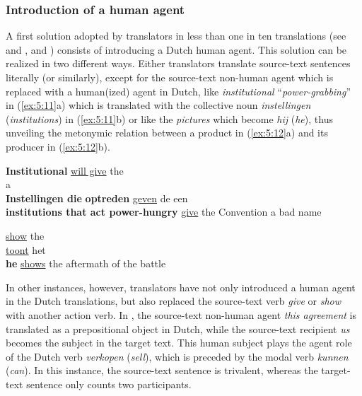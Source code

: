 \documentclass[output=paper]{LSP/langsci}
\begin{document}
\subsubsection{Introduction of a human agent} \label{sec:5:6:2:1}

A first solution adopted by translators in less than one in ten translations (see  and ,  and ) consists of introducing a Dutch human agent. This solution can be realized in two different ways. Either translators translate source-text sentences literally (or similarly), except for the source-text non-human agent which is replaced with a human(ized) agent in Dutch, like \textit{institutional} “\textit{power-grabbing}” in (\ref{ex:5:11}a) which is translated with the collective noun \textit{instellingen} (\textit{institutions}) in (\ref{ex:5:11}b) or like the \textit{pictures} which become \textit{hij} (\textit{he}), thus unveiling the metonymic relation between a product in (\ref{ex:5:12}a) and its producer in (\ref{ex:5:12}b).  

\ea \label{ex:5:11}
\ea \textbf{Institutional}  \ul{will give} the \\ a \\[1em]
\ex \textbf{Instellingen die}  \textbf{optreden} \ul{geven} de  een \\
\textbf{institutions that act power-hungry} \ul{give} the Convention a bad name
\z
\z


\ea \label{ex:5:12}
\ea
{} \ul{show} the \\[1em]
\ex {} \ul{toont} het \\
\textbf{he} \ul{shows} the aftermath of the battle
\z
\z
{}


In other instances, however, translators have not only introduced a human agent in the Dutch translations, but also replaced the source-text verb \textit{give} or \textit{show} with another action verb. In , the source-text non-human agent \textit{this agreement} is translated as a prepositional object in Dutch, while the source-text recipient \textit{us} becomes the subject in the target text. This human subject plays the agent role of the Dutch verb \textit{verkopen} (\textit{sell}), which is preceded by the modal verb \textit{kunnen} (\textit{can}). In this instance, the source-text sentence is trivalent, whereas the target-text sentence only counts two participants. 
\end{document}
